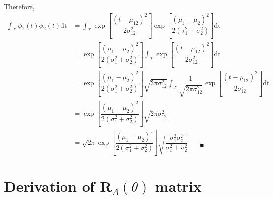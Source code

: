 Therefore,
\begin{align}
\int_{\mathcal{T}} \phi_1(t) \phi_2(t)\mathrm{dt} &= \int_{\mathcal{T}} \exp \left[\dfrac{\left(t-\mu_{12}\right)^2}{2\sigma^2_{12}}\right] \exp \left[\dfrac{\left(\mu_1-\mu_2\right)^2}{2\left(\sigma_1^2+\sigma^2_2\right)}\right] \mathrm{dt} \nonumber \\
&= \exp \left[\dfrac{\left(\mu_1-\mu_2\right)^2}{2\left(\sigma_1^2+\sigma^2_2\right)}\right] \int_{\mathcal{T}} \exp \left[\dfrac{\left(t-\mu_{12}\right)^2}{2\sigma^2_{12}}\right] \mathrm{dt} \nonumber \\
&= \exp \left[\dfrac{\left(\mu_1-\mu_2\right)^2}{2\left(\sigma_1^2+\sigma^2_2\right)}\right] \sqrt{2\pi \sigma^2_{12}} \int_{\mathcal{T}} \dfrac{1}{\sqrt{2\pi \sigma^2_{12}}} \exp \left[\dfrac{\left(t-\mu_{12}\right)^2}{2\sigma^2_{12}}\right] \mathrm{dt} \nonumber \\
&= \exp \left[\dfrac{\left(\mu_1-\mu_2\right)^2}{2\left(\sigma_1^2+\sigma^2_2\right)}\right] \sqrt{2\pi \sigma^2_{12}} \nonumber \\
&= \sqrt{2\pi} \exp \left[\dfrac{\left(\mu_1-\mu_2\right)^2}{2\left(\sigma_1^2+\sigma^2_2\right)}\right] \sqrt{\dfrac{\sigma^2_1\sigma^2_2}{\sigma^2_1+\sigma^2_2}} \quad \text{  }_{\blacksquare}
\end{align}

\section{Derivation of \textbf{R}${}_{\Lambda}(\theta)$ matrix}

